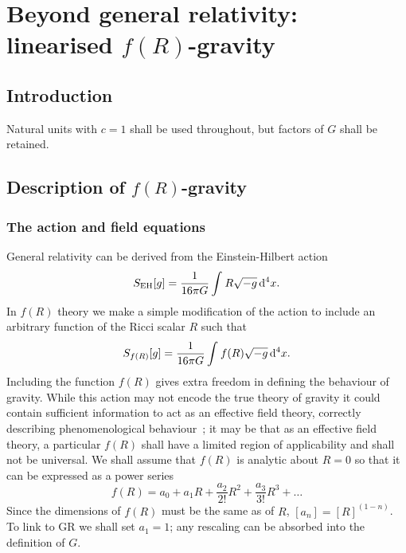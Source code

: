 \chapter{Beyond general relativity: linearised $f(R)$-gravity}

\section{Introduction}

Natural units with $c = 1$ shall be used throughout, but factors of $G$ shall be retained.

\section{Description of $f(R)$-gravity}

\subsection{The action and field equations\label{sec:Action}}

General relativity can be derived from the Einstein-Hilbert action~\cite{Misner1973, Landau1975}
\begin{equation}
S_\mathrm{EH}[g] = \frac{1}{16\pi G}\int_{}^{}{R\sqrt{-g}}\,\mathrm{d}{^4x}.
\end{equation}
In $f(R)$ theory we make a simple modification of the action to include an arbitrary function of the Ricci scalar $R$ such that~\cite{Buchdahl1970}
\begin{equation}
S_{f(R)}[g] = \frac{1}{16\pi G}\int_{}^{}{f(R)\sqrt{-g}}\,\mathrm{d}{^4x}.
\end{equation}
Including the function $f(R)$ gives extra freedom in defining the behaviour of gravity. While this action may not encode the true theory of gravity it could contain sufficient information to act as an effective field theory, correctly describing phenomenological behaviour~\cite{Park2010}; it may be that as an effective field theory, a particular $f(R)$ shall have a limited region of applicability and shall not be universal. We shall assume that $f(R)$ is analytic about $R = 0$ so that it can be expressed as a power series~\cite{Buchdahl1970, Capozziello2007, Faulkner2007, Clifton2008, Psaltis2008}
\begin{equation}
f(R) = a_0 + a_1 R + \frac{a_2}{2!}R^2 + \frac{a_3}{3!}R^3 + \ldots
\end{equation}
Since the dimensions of $f(R)$ must be the same as of $R$, $[a_n] = [R]^{(1-n)}$. To link to GR we shall set $a_1 = 1$; any rescaling can be absorbed into the definition of $G$.

